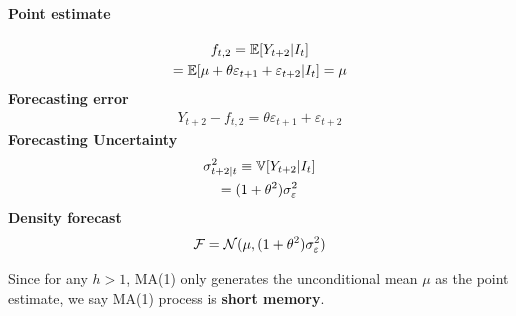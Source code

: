 \documentclass[11pt]{article}
\begin{document}
				\paragraph{Point estimate}
					\begin{gather}
						f_{t,2} = \mathbb{E}[{Y_{t+2} | I_t}] \\
						= \mathbb{E}[{\mu + \theta \varepsilon_{t+1} + \varepsilon_{t+2} | I_t}]
						= \mu
					\end{gather}
				\textbf{Forecasting error}
					\begin{gather}
						Y_{t+2} - f_{t,2} = \theta \varepsilon_{t+1} + \varepsilon_{t+2}
					\end{gather}
				\textbf{Forecasting Uncertainty}
					\begin{gather}
						\sigma_{t+2|t}^2 \equiv \mathbb{V}[{Y_{t+2} | I_t}] \\
						= (1 + \theta^2) \sigma_{\varepsilon}^2 
					\end{gather}
				\textbf{Density forecast}
					\begin{gather}
						\mathcal{{F}} = \mathcal{{N}}(\mu, (1 + \theta^2)\sigma_{\varepsilon}^2)
					\end{gather}
				\begin{remark}
					Since for any $h > 1$, MA(1) only generates the unconditional mean $\mu$ as the point estimate, we say MA(1) process is \textbf{short memory}.
				\end{remark}
\end{document}

